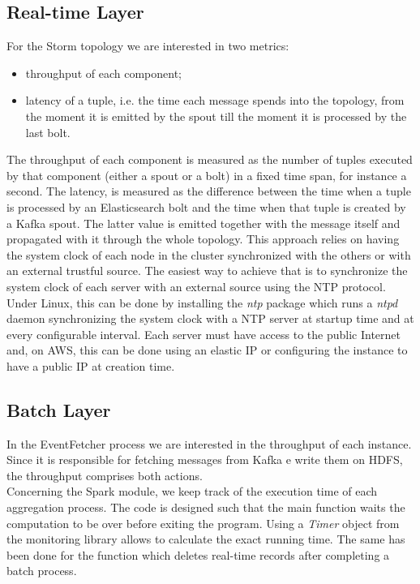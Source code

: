 \subsection{Real-time Layer}
For the Storm topology we are interested in two metrics:
\begin{itemize}
\item throughput of each component;
\item latency of a tuple, i.e. the time each message spends into the topology, from the moment it is emitted by the spout till the moment it is processed by the last bolt.
\end{itemize}
The throughput of each component is measured as the number of tuples executed by that component (either a spout or a bolt) in a fixed time span, for instance a second. The latency, is measured as the difference between the time when a tuple is processed by an Elasticsearch bolt and the time when that tuple is created by a Kafka spout. The latter value is emitted together with the message itself and propagated with it through the whole topology. This approach relies on having the system clock of each node in the cluster synchronized with the others or with an external trustful source. The easiest way to achieve that is to synchronize the system clock of each server with an external source using the NTP protocol. Under Linux, this can be done by installing the \textit{ntp} package which runs a \textit{ntpd} daemon synchronizing the system clock with a NTP server at startup time and at every configurable interval. Each server must have access to the public Internet and, on AWS, this can be done using an elastic IP or configuring the instance to have a public IP at creation time.
\subsection{Batch Layer}
In the EventFetcher process we are interested in the throughput of each instance. Since it is responsible for fetching messages from Kafka e write them on HDFS, the throughput comprises both actions.\\
Concerning the Spark module, we keep track of the execution time of each aggregation process. The code is designed such that the main function waits the computation to be over before exiting the program. Using a \textit{Timer} object from the monitoring library allows to calculate the exact running time. The same has been done for the function which deletes real-time records after completing a batch process.
